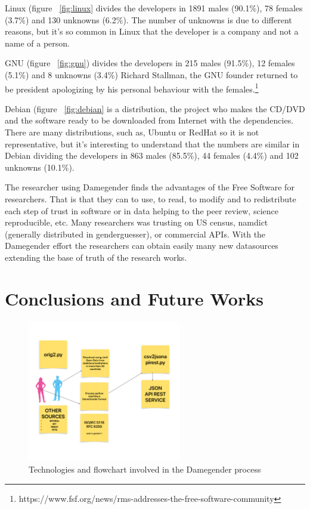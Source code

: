 \documentclass[a4paper]{article}
\begin{document}
Linux (figure ~\ref{fig:linux} divides the developers in 1891
males (90.1\%), 78 females (3.7\%) and 130 unknowns (6.2\%).
The number of unknowns is due to different reasons, but it's so
common in Linux that the developer is a company and not a name
of a person.

GNU (figure ~\ref{fig:gnu}) divides the developers in 215
males (91.5\%), 12 females (5.1\%) and 8 unknowns (3.4\%)
Richard Stallman, the GNU founder returned to
be president apologizing by his personal behaviour with the
females.\footnote{https://www.fsf.org/news/rms-addresses-the-free-software-community}

Debian (figure ~\ref{fig:debian} is a distribution, the
project who makes the CD/DVD and the software ready to be
downloaded from Internet with the dependencies. There are
many distributions, such as, Ubuntu or RedHat
so it is not representative, but it's interesting to understand that
the numbers are similar in Debian dividing the developers in 863 males
(85.5\%), 44 females (4.4\%) and 102 unknowns (10.1\%).

The researcher using Damegender finds the advantages of the Free Software
for researchers. That is that they can to use, to read, to modify and
to redistribute each step of trust in software or in data helping to the
peer review, science reproducible, etc. Many researchers
was trusting on US census, namdict (generally distributed in genderguesser),
or commercial APIs. With the Damegender effort the researchers can obtain easily 
many new datasources extending the base of truth of the research works.


\section{Conclusions and Future Works}
\label{sec:conclusions}

\begin{figure}
  \centering
  \includegraphics[width=0.6\textwidth]{images/flowchart.pdf}
  \caption[Caption for flowchart]{Technologies and flowchart involved in the Damegender process}
  \label{fig:flowchart}
\end{figure}
\end{document}
